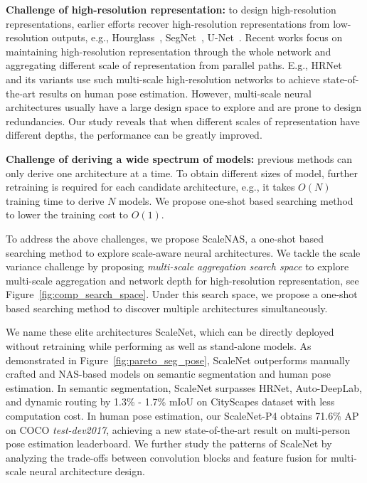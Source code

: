 \documentclass[final]{cvpr}
\newcommand{\workname}{ScaleNAS\xspace}
\newcommand{\netname}{ScaleNet\xspace}
\begin{document}
\textbf{Challenge of high-resolution representation:}
to design high-resolution representations, earlier efforts recover high-resolution representations from low-resolution outputs, e.g., Hourglass~\cite{newell2016stacked}, SegNet~\cite{badrinarayanan2017segnet}, U-Net~\cite{ronneberger2015u}. Recent works focus on maintaining high-resolution representation through the whole network and aggregating different scale of representation from parallel paths. E.g., HRNet~\cite{sun2019deep, wang2020deep} and its variants use such multi-scale high-resolution networks to achieve state-of-the-art results on human pose estimation. 
However, multi-scale neural architectures usually have a large design space to explore and are prone to design redundancies. 
Our study reveals that when different scales of representation have different depths, the performance can be greatly improved. 

\textbf{Challenge of deriving a wide spectrum of models:}
previous methods can only derive one architecture at a time. To obtain different sizes of model, further retraining is required for each candidate architecture,  
e.g., it takes $O(N)$ training time to derive $N$ models.
We propose one-shot based searching method to lower the training cost to $O(1)$. 


To address the above challenges, we propose \workname, a one-shot based searching method to explore scale-aware neural architectures.
We tackle the scale variance challenge by proposing \textit{multi-scale aggregation search space} to explore multi-scale aggregation and network depth for high-resolution representation, see Figure~\ref{fig:comp_search_space}.
Under this search space, we propose a one-shot based searching method to discover multiple  architectures simultaneously. 

We name these elite architectures \netname, which can be directly deployed without retraining while performing as well as stand-alone models. As demonstrated in Figure~\ref{fig:pareto_seg_pose},
\netname outperforms manually crafted and NAS-based models on semantic segmentation and human pose estimation. In semantic segmentation, \netname surpasses HRNet, Auto-DeepLab, and dynamic routing by 1.3\% - 1.7\% mIoU on CityScapes dataset with less computation cost. In human pose estimation, our  ScaleNet-P4 obtains 71.6\% AP on COCO \textit{test-dev2017}, achieving a new state-of-the-art result on multi-person pose estimation leaderboard.
We further study the patterns of \netname by analyzing the trade-offs between convolution blocks and feature fusion for multi-scale neural architecture design.
\end{document}
